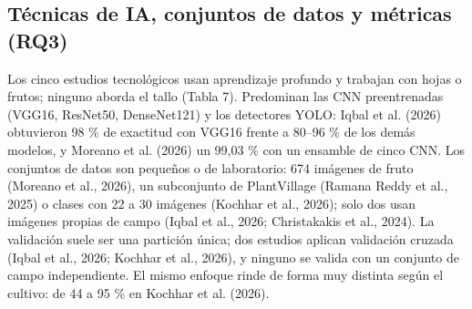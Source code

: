 \documentclass[11pt]{article}
\begin{document}
\subsection{Técnicas de IA, conjuntos de datos y métricas (RQ3)}

Los cinco estudios tecnológicos usan aprendizaje profundo y trabajan con hojas o frutos; ninguno aborda el tallo (Tabla 7). Predominan las CNN preentrenadas (VGG16, ResNet50, DenseNet121) y los detectores YOLO: Iqbal et al. (2026) obtuvieron 98 \% de exactitud con VGG16 frente a 80–96 \% de los demás modelos, y Moreano et al. (2026) un 99,03 \% con un ensamble de cinco CNN. Los conjuntos de datos son pequeños o de laboratorio: 674 imágenes de fruto (Moreano et al., 2026), un subconjunto de PlantVillage (Ramana Reddy et al., 2025) o clases con 22 a 30 imágenes (Kochhar et al., 2026); solo dos usan imágenes propias de campo (Iqbal et al., 2026; Christakakis et al., 2024). La validación suele ser una partición única; dos estudios aplican validación cruzada (Iqbal et al., 2026; Kochhar et al., 2026), y ninguno se valida con un conjunto de campo independiente. El mismo enfoque rinde de forma muy distinta según el cultivo: de 44 a 95 \% en Kochhar et al. (2026).
\end{document}
